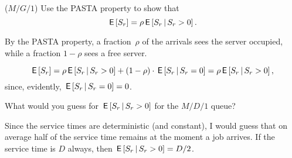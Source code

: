 \begin{exercise}($M/G/1$)
Use  the PASTA property to show that 
\begin{equation}\label{eq:37}
\,\mathsf{E}\left[S_r\right] =  \rho \,\mathsf{E}\left[S_r\,\middle|\, S_r>0\right].
\end{equation}
\begin{hint}
By the PASTA property, a fraction~$\rho$ of the arrivals sees the server occupied, while a fraction $1-\rho$ sees
a free server.  
\end{hint}
\begin{solution}
\begin{equation*}
\,\mathsf{E}\left[S_r\right] =   \rho \,\mathsf{E}\left[S_r\,\middle|\, S_r >0\right] + (1-\rho)\cdot \,\mathsf{E}\left[S_r\,\middle|\, S_r = 0\right] = \rho \,\mathsf{E}\left[S_r\,\middle|\, S_r>0\right],
\end{equation*}
since, evidently, $\,\mathsf{E}\left[S_r\,\middle|\, S_r=0\right]=0$.  
\end{solution}
\end{exercise}

\begin{exercise}
  What would you guess for $\,\mathsf{E}\left[S_r\,\middle|\, S_r>0\right]$ for the $M/D/1$ queue? 
  \begin{solution}
    Since the service times are deterministic (and constant), I would
    guess that on average half of the service time remains at the
    moment a job arrives. If the service time is $D$ always, then
    $\,\mathsf{E}\left[S_r\,\middle|\, S_r>0\right] = D/2$.  
  \end{solution}
\end{exercise}

